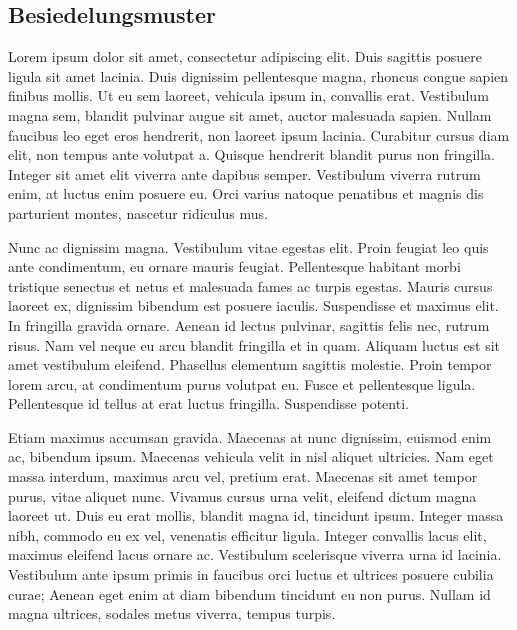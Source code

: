 \documentclass[
  ngerman,
  14pt,
  a4paper,
  DIV=11,
  twoside]{scrreprt}
\begin{document}
\subsection{Besiedelungsmuster}\label{besiedelungsmuster}

Lorem ipsum dolor sit amet, consectetur adipiscing elit. Duis sagittis
posuere ligula sit amet lacinia. Duis dignissim pellentesque magna,
rhoncus congue sapien finibus mollis. Ut eu sem laoreet, vehicula ipsum
in, convallis erat. Vestibulum magna sem, blandit pulvinar augue sit
amet, auctor malesuada sapien. Nullam faucibus leo eget eros hendrerit,
non laoreet ipsum lacinia. Curabitur cursus diam elit, non tempus ante
volutpat a. Quisque hendrerit blandit purus non fringilla. Integer sit
amet elit viverra ante dapibus semper. Vestibulum viverra rutrum enim,
at luctus enim posuere eu. Orci varius natoque penatibus et magnis dis
parturient montes, nascetur ridiculus mus.

Nunc ac dignissim magna. Vestibulum vitae egestas elit. Proin feugiat
leo quis ante condimentum, eu ornare mauris feugiat. Pellentesque
habitant morbi tristique senectus et netus et malesuada fames ac turpis
egestas. Mauris cursus laoreet ex, dignissim bibendum est posuere
iaculis. Suspendisse et maximus elit. In fringilla gravida ornare.
Aenean id lectus pulvinar, sagittis felis nec, rutrum risus. Nam vel
neque eu arcu blandit fringilla et in quam. Aliquam luctus est sit amet
vestibulum eleifend. Phasellus elementum sagittis molestie. Proin tempor
lorem arcu, at condimentum purus volutpat eu. Fusce et pellentesque
ligula. Pellentesque id tellus at erat luctus fringilla. Suspendisse
potenti.

Etiam maximus accumsan gravida. Maecenas at nunc dignissim, euismod enim
ac, bibendum ipsum. Maecenas vehicula velit in nisl aliquet ultricies.
Nam eget massa interdum, maximus arcu vel, pretium erat. Maecenas sit
amet tempor purus, vitae aliquet nunc. Vivamus cursus urna velit,
eleifend dictum magna laoreet ut. Duis eu erat mollis, blandit magna id,
tincidunt ipsum. Integer massa nibh, commodo eu ex vel, venenatis
efficitur ligula. Integer convallis lacus elit, maximus eleifend lacus
ornare ac. Vestibulum scelerisque viverra urna id lacinia. Vestibulum
ante ipsum primis in faucibus orci luctus et ultrices posuere cubilia
curae; Aenean eget enim at diam bibendum tincidunt eu non purus. Nullam
id magna ultrices, sodales metus viverra, tempus turpis.
\end{document}
